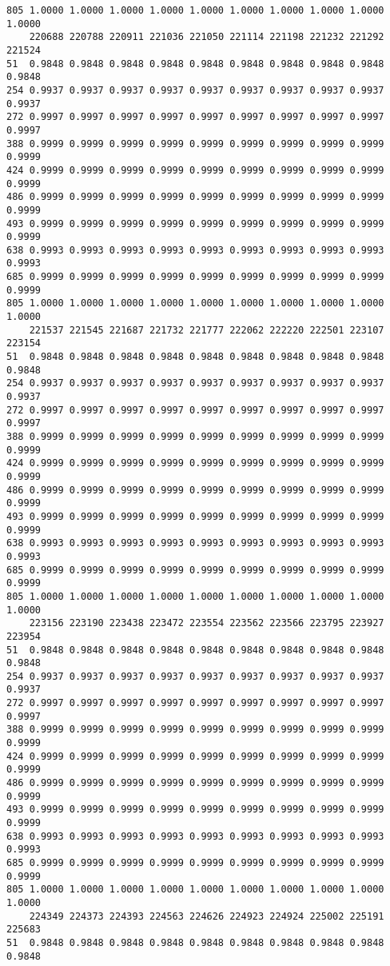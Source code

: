 \documentclass[
]{report}
\begin{document}
\begin{verbatim}
805 1.0000 1.0000 1.0000 1.0000 1.0000 1.0000 1.0000 1.0000 1.0000 1.0000
    220688 220788 220911 221036 221050 221114 221198 221232 221292 221524
51  0.9848 0.9848 0.9848 0.9848 0.9848 0.9848 0.9848 0.9848 0.9848 0.9848
254 0.9937 0.9937 0.9937 0.9937 0.9937 0.9937 0.9937 0.9937 0.9937 0.9937
272 0.9997 0.9997 0.9997 0.9997 0.9997 0.9997 0.9997 0.9997 0.9997 0.9997
388 0.9999 0.9999 0.9999 0.9999 0.9999 0.9999 0.9999 0.9999 0.9999 0.9999
424 0.9999 0.9999 0.9999 0.9999 0.9999 0.9999 0.9999 0.9999 0.9999 0.9999
486 0.9999 0.9999 0.9999 0.9999 0.9999 0.9999 0.9999 0.9999 0.9999 0.9999
493 0.9999 0.9999 0.9999 0.9999 0.9999 0.9999 0.9999 0.9999 0.9999 0.9999
638 0.9993 0.9993 0.9993 0.9993 0.9993 0.9993 0.9993 0.9993 0.9993 0.9993
685 0.9999 0.9999 0.9999 0.9999 0.9999 0.9999 0.9999 0.9999 0.9999 0.9999
805 1.0000 1.0000 1.0000 1.0000 1.0000 1.0000 1.0000 1.0000 1.0000 1.0000
    221537 221545 221687 221732 221777 222062 222220 222501 223107 223154
51  0.9848 0.9848 0.9848 0.9848 0.9848 0.9848 0.9848 0.9848 0.9848 0.9848
254 0.9937 0.9937 0.9937 0.9937 0.9937 0.9937 0.9937 0.9937 0.9937 0.9937
272 0.9997 0.9997 0.9997 0.9997 0.9997 0.9997 0.9997 0.9997 0.9997 0.9997
388 0.9999 0.9999 0.9999 0.9999 0.9999 0.9999 0.9999 0.9999 0.9999 0.9999
424 0.9999 0.9999 0.9999 0.9999 0.9999 0.9999 0.9999 0.9999 0.9999 0.9999
486 0.9999 0.9999 0.9999 0.9999 0.9999 0.9999 0.9999 0.9999 0.9999 0.9999
493 0.9999 0.9999 0.9999 0.9999 0.9999 0.9999 0.9999 0.9999 0.9999 0.9999
638 0.9993 0.9993 0.9993 0.9993 0.9993 0.9993 0.9993 0.9993 0.9993 0.9993
685 0.9999 0.9999 0.9999 0.9999 0.9999 0.9999 0.9999 0.9999 0.9999 0.9999
805 1.0000 1.0000 1.0000 1.0000 1.0000 1.0000 1.0000 1.0000 1.0000 1.0000
    223156 223190 223438 223472 223554 223562 223566 223795 223927 223954
51  0.9848 0.9848 0.9848 0.9848 0.9848 0.9848 0.9848 0.9848 0.9848 0.9848
254 0.9937 0.9937 0.9937 0.9937 0.9937 0.9937 0.9937 0.9937 0.9937 0.9937
272 0.9997 0.9997 0.9997 0.9997 0.9997 0.9997 0.9997 0.9997 0.9997 0.9997
388 0.9999 0.9999 0.9999 0.9999 0.9999 0.9999 0.9999 0.9999 0.9999 0.9999
424 0.9999 0.9999 0.9999 0.9999 0.9999 0.9999 0.9999 0.9999 0.9999 0.9999
486 0.9999 0.9999 0.9999 0.9999 0.9999 0.9999 0.9999 0.9999 0.9999 0.9999
493 0.9999 0.9999 0.9999 0.9999 0.9999 0.9999 0.9999 0.9999 0.9999 0.9999
638 0.9993 0.9993 0.9993 0.9993 0.9993 0.9993 0.9993 0.9993 0.9993 0.9993
685 0.9999 0.9999 0.9999 0.9999 0.9999 0.9999 0.9999 0.9999 0.9999 0.9999
805 1.0000 1.0000 1.0000 1.0000 1.0000 1.0000 1.0000 1.0000 1.0000 1.0000
    224349 224373 224393 224563 224626 224923 224924 225002 225191 225683
51  0.9848 0.9848 0.9848 0.9848 0.9848 0.9848 0.9848 0.9848 0.9848 0.9848

\end{verbatim}
\end{document}
